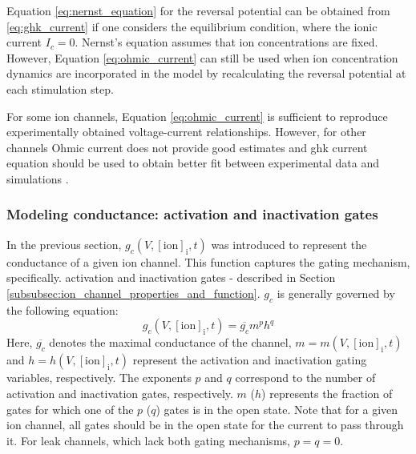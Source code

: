 \documentclass[../main.tex]{subfiles}
\begin{document}
Equation \ref{eq:nernst_equation} for the reversal potential can be obtained from \ref{eq:ghk_current} if one considers
the equilibrium condition, where the ionic current $I_c=0$. Nernst's equation assumes that ion concentrations
are fixed. However, Equation \ref{eq:ohmic_current} can still be used when ion concentration dynamics
are incorporated in the model by recalculating the reversal potential at each stimulation step.

For some ion channels, Equation \ref{eq:ohmic_current} is sufficient to reproduce experimentally obtained
voltage-current relationships. However, for other channels Ohmic current does not provide good
estimates and \gls{ghk} current equation should be used to obtain better fit between
experimental data and simulations \parencite{huguenardSimulationCurrentsInvolved1992}.

\subsubsection{Modeling conductance: activation and inactivation gates} \label{subsubsec:modeling_conductance}

In the previous section, $g_c(V,[\text{ion}]_{\text{i}},t)$ was introduced to represent the conductance of a given ion channel. This function captures the gating mechanism, specifically. activation and inactivation gates - described in Section \ref{subsubsec:ion_channel_properties_and_function}. $g_c$ is generally governed by the following equation:
\begin{equation} \label{eq:conductance_wrt_gating_variables}
    g_c(V,[\text{ion}]_{\text{i}},t) = \overline{g_c} m^p h^q
\end{equation}
Here, $\overline{g_c}$ denotes the maximal conductance of the channel,
$m=m(V,[\text{ion}]_{\text{i}},t)$ and $h=h(V,[\text{ion}]_{\text{i}},t)$ represent the activation and inactivation gating variables, respectively. The exponents $p$ and $q$ correspond to the number of activation and inactivation gates, respectively. $m$ ($h$) represents the fraction of gates for which one of the $p$ ($q$) gates is in the open state. Note that for a given ion channel, all gates should be in the open state for the current to pass through it. For leak channels, which lack both gating mechanisms, $p=q=0$. 
\end{document}
